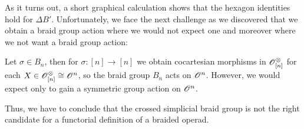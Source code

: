 As it turns out, a short graphical calculation shows that the hexagon identities hold for $\Delta B'$.
Unfortunately, we face the next challenge as we discovered that we obtain a braid group action 
where we would not expect one and moreover where we not want a braid group action:

Let $\sigma \in B_n$, then for $\sigma \colon [n] \to [n]$ we obtain cocartesian morphisms in $\mathscr{O}^{\otimes}_{[n]}$ for
each $X \in \mathscr{O}^{\otimes}_{[n]} \cong \mathscr{O}^n$, so the braid group $B_n$ acts on $\mathscr{O}^n$. However, we would expect only to
gain a symmetric group action on $\mathscr{O}^n$.

Thus, we have to conclude that the crossed simplicial braid group is not the right candidate for
a functorial definition of a braided operad.